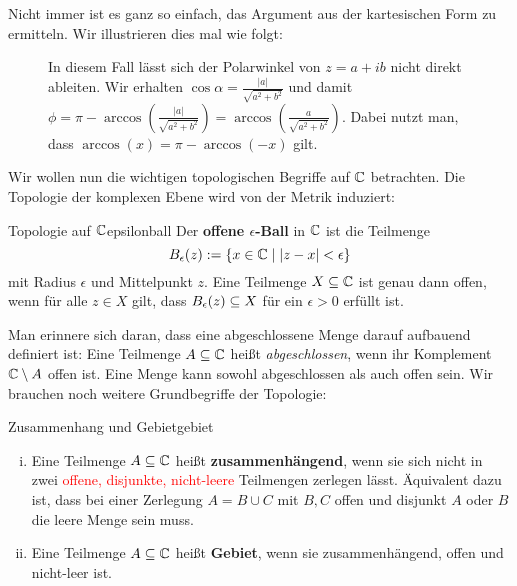Nicht immer ist es ganz so einfach, das Argument aus der kartesischen Form zu ermitteln. Wir illustrieren dies mal wie folgt:
\begin{figure}[H]
\centering
{}
\caption{In diesem Fall lässt sich der Polarwinkel von $z=a+ib$ nicht direkt ableiten. Wir erhalten $\cos \alpha = \frac{|a|}{\sqrt{a^2+b^2}}$ und damit $\phi = \pi - \arccos(\frac{|a|}{\sqrt{a^2+b^2}}) = \arccos(\frac{a}{\sqrt{a^2+b^2}})$. Dabei nutzt man, dass $\arccos(x) = \pi - \arccos(-x)$ gilt.}
\end{figure}
Wir wollen nun die wichtigen topologischen Begriffe auf $\mathbb{C}$ betrachten. Die Topologie der komplexen Ebene wird von der Metrik induziert:
\begin{definition}{Topologie auf $\mathbb{C}$}{epsilonball}
Der \textbf{offene $\epsilon$-Ball} in $\mathbb{C}$ ist die Teilmenge 
\begin{equation}
B_\epsilon(z) := \{x \in \mathbb{C} \mid |z-x| < \epsilon\}
\end{equation}
mit Radius $\epsilon$ und Mittelpunkt $z$. Eine Teilmenge $X \subseteq \mathbb{C}$ ist genau dann offen, wenn für alle $z \in X$ gilt, dass $B_\epsilon(z) \subseteq X$ für ein $\epsilon>0$ erfüllt ist.
\end{definition}
Man erinnere sich daran, dass eine abgeschlossene Menge darauf aufbauend definiert ist: Eine Teilmenge $A \subseteq \mathbb{C}$ heißt \textit{abgeschlossen}, wenn ihr Komplement $\mathbb{C} \setminus A$ offen ist. Eine Menge kann sowohl abgeschlossen als auch offen sein. Wir brauchen noch weitere Grundbegriffe der Topologie:
\begin{definition}{Zusammenhang und Gebiet}{gebiet}
\begin{enumerate}[(i)]
\item Eine Teilmenge $A \subseteq \mathbb{C}$ heißt \textbf{zusammenhängend}, wenn sie sich nicht in zwei \textcolor{red}{offene, disjunkte, nicht-leere} Teilmengen zerlegen lässt. Äquivalent dazu ist, dass bei einer Zerlegung $A = B \cup C$ mit $B,C$ offen und disjunkt $A$ oder $B$ die leere Menge sein muss.
\item Eine Teilmenge $A \subseteq \mathbb{C}$ heißt \textbf{Gebiet}, wenn sie zusammenhängend, offen und nicht-leer ist.
\end{enumerate}
\end{definition}

